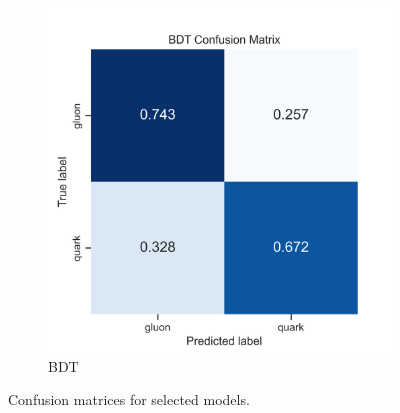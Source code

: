 \begin{figure}[ht]
\begin{subfigure}[b]{0.49\textwidth}
        \includegraphics[width=\textwidth]{src/plots/results/cm/bdt.png}
        \caption{BDT}
        \label{fig:confusion_bdt}
    \end{subfigure}
    \caption{Confusion matrices for selected models.}
    \label{fig:confusion}
\end{figure}
